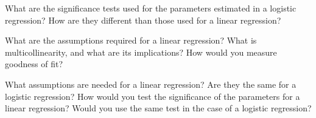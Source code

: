 \documentclass[answers]{exam}
\begin{document}
\begin{questions}
\begin{solution}[.2in]
\end{solution}

\question %
What are the significance tests used for the parameters estimated in a logistic regression?
How are they different than those used for a linear regression?

\question
What are the assumptions required for a linear regression?
What is multicollinearity, and what are its implications?
How would you measure goodness of fit?

\question
What assumptions are needed for a linear regression?
Are they the same for a logistic regression?
How would you test the significance of the parameters for a linear regression?
Would you use the same test in the case of a logistic regression?
\end{questions}
\end{document}
